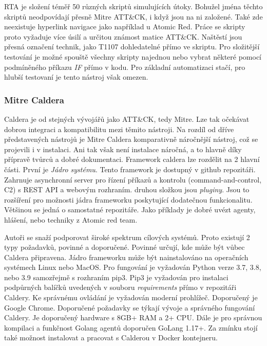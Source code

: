\ac{RTA} je složení téměř 50 různých skriptů simulujících útoky.
Bohužel jména těchto skriptů neodpovídají přesně Mitre ATT\&CK, i když jsou na ni založené.
Také zde neexistuje hyperlink navigace jako například u Atomic Red.
Práce se skripty proto vyžaduje více úsilí a určitou známost matice ATT\&CK\@.
Naštěstí jsou přesná označení technik, jako T1107 dohledatelné přímo ve skriptu.
Pro složitější testování je možné spouště všechny skripty najednou nebo vybrat některé pomocí podmíněného příkazu \textit{IF} přímo v kodu.
Pro základní automatizaci stačí, pro hlubší testovaní je tento nástroj však omezen.\cite{csoonline_4_testing_frameworks}


\subsubsection{Mitre Caldera}
Caldera je od stejných vývojářů jako ATT\&CK, tedy Mitre.
Lze tak očekávat dobrou integraci a kompatibilitu mezi těmito nástroji.
Na rozdíl od dříve představených nástrojů je Mitre Caldera komparativně náročnější nástroj, což se projevili i v instalaci.
Ani tak však není instalace náročná, a to hlavně díky přípravě tvůrců a dobré dokumentaci\cite{mitre_caldera_docs}.
Framework caldera lze rozdělit na 2 hlavní části.
První je \textit{Jádro systému}.
Tento framework je dostupný v github repozitáři.
Zahrnuje asynchronní server pro řízení příkazů a kontrolu (command-and-control, C2) s REST API a webovým rozhraním.
druhou složkou jsou \textit{pluginy}.
Jsou to rozšíření pro možnosti jádra frameworku poskytující dodatečnou funkcionalitu.
Většinou se jedná o samostatné repozitáře.
Jako příklady je dobré uvézt agenty, hlášení, nebo  techniky z Atomic red team.\cite{mitre_caldera}

Autoři se snaží podporovat široké spektrum cílových systémů.
Proto existují 2 typy požadavků, povinné a doporučené.
Povinné určují, kde může být vůbec Caldera připravena.
Jádro frameworku může být nainstalováno na operačních systémech Linux nebo MacOS.
Pro fungování je vyžadován Python verze 3.7, 3.8, nebo 3.9 samozřejmě s rozhraním pip3.
Pip3 je vyžadován pro instalaci podpůrných balíčků uvedených v souboru \textit{requirements} přímo v repozitáři Caldery.
Ke správnému ovládání je vyžadován moderní prohlížeč.
Doporučený je Google Chrome.
Doporučené požadavky se týkají vývoje a správného fungování Caldery.
Je doporučený hardware s 8GB+ RAM a 2+ CPU\@.
Dále je pro správnou kompilaci a funkčnost Golang agentů doporučen GoLang 1.17+.
Za zmínku stojí také možnost instalovat a pracovat s Calderou v Docker kontejneru.\cite{mitre_caldera_docs}

